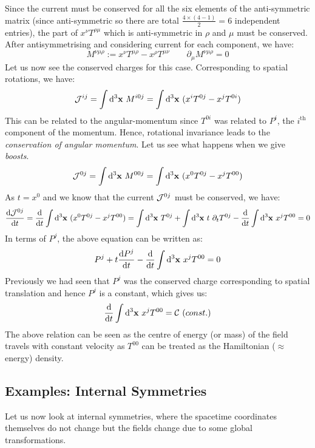 Since the current must be conserved for all the six elements of the anti-symmetric matrix (since anti-symmetric so there are total $\frac{4\times (4-1)}{2} = 6$ independent entries), the part of $x^\nu T^{\rho\mu}$ which is anti-symmetric in $\rho$ and $\mu$ must be conserved. After antisymmetrising and considering current for each component, we have:
$$M^{\nu\mu\rho} := x^\nu T^{\mu\rho} - x^\rho T^{\mu\nu} \qquad \partial_\mu M^{\nu\mu\rho} =0 $$
Let us now see the conserved charges for this case. Corresponding to spatial rotations, we have:
\begin{align*}
    \mathcal J^{ij} =\int \dd^3\vb{x} \ M^{i0j} = \int \dd^3\vb{x}\ (x^i T^{0j} - x^j T^{0i})
\end{align*}
This can be related to the angular-momentum since $T^{0i}$ was related to $P^i$, the $i^{\mathrm{th}}$ component of the momentum. Hence, rotational invariance leads to the \textit{conservation of angular momentum}. Let us see what happens when we give \textit{boosts}. 
$$\mathcal J^{0j} =\int \dd^3\vb{x} \ M^{00j} = \int \dd^3\vb{x}\ (x^0 T^{0j} - x^j T^{00})$$
As $t=x^0$ and we know that the current $\mathcal J^{0j}$ must be conserved, we have:
$$\dv{\SJ^{0j}}{t} = \dv{t}\int \dd^3\vb{x}\ (x^0 T^{0j} - x^j T^{00})= \int \dd^3\vb{x}\ T^{0j} + \int \dd^3\vb{x}\ t \ \partial_t T^{0j} - \dv{t}\int \dd^3\vb{x}\ x^j T^{00}=0$$
In terms of $P^j$, the above equation can be written as:
$$P^j + t\dv{P^j}{t} -\dv{t}\int \dd^3\vb{x}\ x^j T^{00} = 0$$
Previously we had seen that $P^j$ was the conserved charge corresponding to spatial translation and hence $P^j$ is a constant, which gives us:
$$\dv{t}\int \dd^3\vb{x}\ x^j T^{00} = \mathcal C \ \mathrm(const.)$$
The above relation can be seen as the centre of energy (or mass) of the field travels with constant velocity as $T^{00}$ can be treated as the Hamiltonian ($\approx$ energy) density. 
\subsection{Examples: Internal Symmetries}
Let us now look at internal symmetries, where the spacetime coordinates themselves do not change but the fields change due to some global transformations. 
